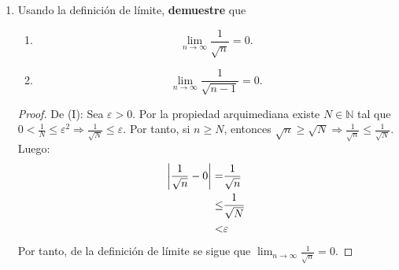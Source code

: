 \documentclass[12pt]{article}
\begin{document}
\begin{enumerate}
    \item Usando la definición de límite, \textbf{demuestre} que
    \begin{multicols}{2}
        \begin{enumerate}
            \item 
                \begin{equation*}
                    \lim_{n\rightarrow \infty}\frac{1}{\sqrt{n}}=0.
                \end{equation*}
            \item 
                \begin{equation*}
                    \lim_{n\rightarrow \infty}\frac{1}{\sqrt{n-1}}=0.
                \end{equation*}
        \end{enumerate}
    \end{multicols}
    \begin{proof}
        De (I): Sea $\varepsilon>0$. Por la propiedad arquimediana existe $N\in\mathbb{N}$ tal que $0<\frac{1}{N}\leq\varepsilon^2\Rightarrow \frac{1}{\sqrt{N}}\leq\varepsilon$. Por tanto, si $n\geq N$, entonces $\sqrt{n}\geq\sqrt{N}\Rightarrow \frac{1}{\sqrt{n}}\leq\frac{1}{\sqrt{N}}$. Luego:
        \begin{equation*}
            \begin{split}
                \left| \frac{1}{\sqrt{n}}-0 \right|=&\frac{1}{\sqrt{n}}\\
                \leq&\frac{1}{\sqrt{N}}\\
                <&\varepsilon
            \end{split}
        \end{equation*}
        Por tanto, de la definición de límite se sigue que $\lim_{n\rightarrow\infty}\frac{1}{\sqrt{n}}=0$.
        

\end{proof}
\end{enumerate}
\end{document}
